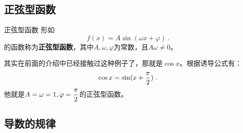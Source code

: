 \subsection{正弦型函数}

\begin{definition}{正弦型函数}
形如
\begin{equation}
f(x)=A\sin(\omega x+\varphi)~.
\end{equation}
的函数称为\textbf{正弦型函数}，其中$A,\omega,\varphi$为常数，且$A\omega\neq0$。
\end{definition}
其实在前面的介绍中已经接触过这种例子了，那就是$\cos x$。根据诱导公式有：
\begin{equation}
\cos x=\sin(x+{\pi\over2})~.
\end{equation}
他就是$\displaystyle A=\omega=1,\varphi={\pi\over2}$的正弦型函数。


\subsection{导数的规律}